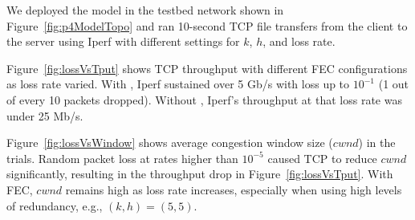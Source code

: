 We deployed the model in the testbed network shown in
Figure~\ref{fig:p4ModelTopo} and ran 10-second TCP file transfers from
the client to the server using Iperf with different settings for $k$, $h$, and
loss rate. 










Figure~\ref{fig:lossVsTput} shows TCP throughput with different FEC
configurations as loss rate varied. With \OurSys, Iperf sustained  over 5 Gb/s
with loss up to $10^{-1}$ (1 out of every 10 packets dropped). Without
\OurSys, Iperf's throughput at that loss rate was under 25 Mb/s. 

Figure~\ref{fig:lossVsWindow} shows average congestion window size ($cwnd$) in the
trials. Random packet loss at rates higher than $10^{-5}$ caused TCP to
reduce $cwnd$ significantly, resulting in the throughput drop in
Figure~\ref{fig:lossVsTput}. With FEC, $cwnd$ remains high as
loss rate increases, especially when using high levels of redundancy, e.g.,
$(k, h) = (5, 5)$.

